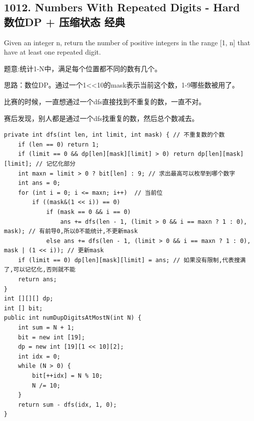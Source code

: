\documentclass[9pt, b5paaper]{book}
\begin{document}
\subsection{1012. Numbers With Repeated Digits - Hard 数位DP + 压缩状态 经典}
\label{sec-1-4-14}
Given an integer n, return the number of positive integers in the range [1, n] that have at least one repeated digit.

题意:统计1-N中，满足每个位置都不同的数有几个。

思路：数位DP。通过一个1<<10的mask表示当前这个数，1-9哪些数被用了。

比赛的时候，一直想通过一个dfs直接找到不重复的数，一直不对。

赛后发现，别人都是通过一个dfs找重复的数，然后总个数减去。

\begin{verbatim}
private int dfs(int len, int limit, int mask) { // 不重复数的个数
    if (len == 0) return 1;
    if (limit == 0 && dp[len][mask][limit] > 0) return dp[len][mask][limit]; // 记忆化部分
    int maxn = limit > 0 ? bit[len] : 9; // 求出最高可以枚举到哪个数字
    int ans = 0;
    for (int i = 0; i <= maxn; i++)  // 当前位
        if ((mask&(1 << i)) == 0)
            if (mask == 0 && i == 0)
                ans += dfs(len - 1, (limit > 0 && i == maxn ? 1 : 0), mask); // 有前导0,所以0不能统计,不更新mask
            else ans += dfs(len - 1, (limit > 0 && i == maxn ? 1 : 0), mask | (1 << i)); // 更新mask
    if (limit == 0) dp[len][mask][limit] = ans; // 如果没有限制,代表搜满了,可以记忆化,否则就不能
    return ans;
}
int [][][] dp;
int [] bit;
public int numDupDigitsAtMostN(int N) {
    int sum = N + 1;
    bit = new int [19];
    dp = new int [19][1 << 10][2];
    int idx = 0;
    while (N > 0) {
        bit[++idx] = N % 10;
        N /= 10;
    }
    return sum - dfs(idx, 1, 0);
}
\end{verbatim}
\end{document}
